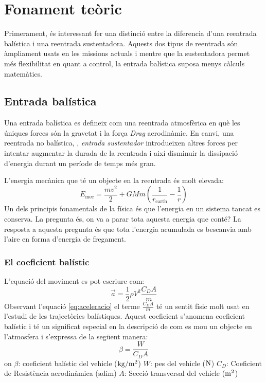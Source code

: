 
\section{Fonament teòric}

Primerament, és interessant fer una distinció entre la diferencia d'una reentrada balística i una reentrada sustentadora. Aquests dos tipus de reentrada són àmpliament usats en les missions actuals i mentre que la sustentadora permet més flexibilitat en quant a control, la entrada balística suposa menys càlculs matemàtics.

\subsection{Entrada balística}
Una entrada balística es defineix com una reentrada atmosfèrica en què les úniques forces són la gravetat i la força \textit{Drag} aerodinàmic. En canvi, una reentrada no balística, \ie, \textit{entrada sustentador} introdueixen altres forces per intentar augmentar la durada de la reentrada i així disminuir la dissipació d’energia durant un període de temps més gran. 

L'energia mecànica que té un objecte en la reentrada és molt elevada:
\begin{equation}
    E_{\mathrm{mec}} = \frac{mv^2}{2} + GMm\left( \frac{1}{r_{\mathrm{earth}}} - \frac{1}{r}\right)
\end{equation}
Un dels principis fonamentals de la física és que l'energia en un sistema tancat es conserva. La pregunta és, on va a parar tota aquesta energia que conté? La resposta a aquesta pregunta és que tota l'energia acumulada es bescanvia amb l'aire en forma d'energia de fregament.


\subsubsection{El coeficient balístic}
L'equació del moviment es pot escriure com:
\begin{equation} \label{eq:aceleracio}
    \Vec{a} = \frac{1}{2}\rho V^2 \frac{C_D A}{m}
\end{equation}
Observant l'equació \ref{eq:aceleracio} el terme $\frac{C_D A}{m}$ té un sentit físic molt usat en l'estudi de les trajectòries balístiques. Aquest coeficient s'anomena coeficient balístic i té un significat especial en la descripció de com es mou un objecte en l'atmosfera i s'expressa de la següent manera:
\begin{equation}
    \beta = \frac{W}{C_D A}
\end{equation}
on 
$\beta$: coeficient balístic del vehicle ($\kg/\meter^2$)
$W$: pes del vehicle ($\newton$)
$C_D$: Coeficient de Resistència aerodinàmica ($\mathrm{adim}$)
$A$: Secció transversal del vehicle ($\meter^2$)

